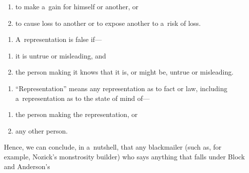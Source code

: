 {\begin{enumerate}
\end{enumerate}

\begin{enumerate}

\item to make a~gain for himself or another, or

\item to cause loss to another or to expose another to a~risk of loss.

\end{enumerate}

\liststyleWWNumiii

\begin{enumerate}

\item A~representation is false if---

\end{enumerate}

\begin{enumerate}

\item it is untrue or misleading, and

\item the person making it knows that it is, or might be, untrue or misleading.

\end{enumerate}

\liststyleWWNumiii

\begin{enumerate}

\item ``Representation'' means any representation as to fact or law, including a~representation as to the state of mind of---

\end{enumerate}

\begin{enumerate}

\item the person making the representation, or

\item any other person.

\end{enumerate}

} Hence, we can conclude, in a~nutshell, that any blackmailer (such as, for example, Nozick's monstrosity builder) who says anything that falls under Block and Anderson's 
\parencite*[][p.546]{block_blackmail_2000} %
